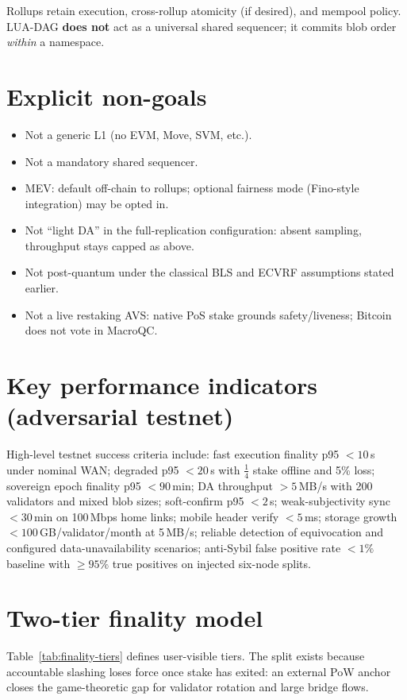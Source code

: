 \documentclass[11pt,a4paper,twoside]{report}
\theoremstyle{definition}
\begin{document}
Rollups retain execution, cross-rollup atomicity (if desired), and mempool policy. LUA-DAG \textbf{does not} act as a universal shared sequencer; it commits blob order \emph{within} a namespace.

\section{Explicit non-goals}
\begin{itemize}[leftmargin=*]
  \item Not a generic L1 (no EVM, Move, SVM, etc.).
  \item Not a mandatory shared sequencer.
  \item MEV: default off-chain to rollups; optional fairness mode (Fino-style integration) may be opted in.
  \item Not ``light DA'' in the full-replication configuration: absent sampling, throughput stays capped as above.
  \item Not post-quantum under the classical BLS and ECVRF assumptions stated earlier.
  \item Not a live restaking AVS: native PoS stake grounds safety/liveness; Bitcoin does not vote in MacroQC.
\end{itemize}

\section{Key performance indicators (adversarial testnet)}
High-level testnet success criteria include: fast execution finality p95 $< 10$\,s under nominal WAN; degraded p95 $< 20$\,s with $\frac{1}{4}$ stake offline and 5\% loss; sovereign epoch finality p95 $< 90$\,min; DA throughput $> 5$\,MB/s with 200 validators and mixed blob sizes; soft-confirm p95 $< 2$\,s; weak-subjectivity sync $< 30$\,min on 100\,Mbps home links; mobile header verify $< 5$\,ms; storage growth $< 100$\,GB/validator/month at 5\,MB/s; reliable detection of equivocation and configured data-unavailability scenarios; anti-Sybil false positive rate $< 1\%$ baseline with $\geq 95\%$ true positives on injected six-node splits.

\section{Two-tier finality model}
\label{sec:finality-tiers}
Table~\ref{tab:finality-tiers} defines user-visible tiers. The split exists because accountable slashing loses force once stake has exited: an external PoW anchor closes the game-theoretic gap for validator rotation and large bridge flows.
\end{document}

